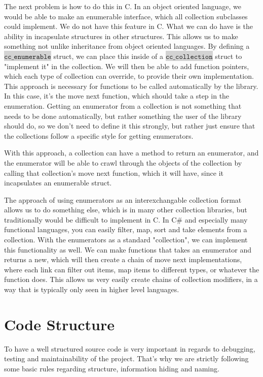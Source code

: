 \documentclass[table]{ituthesis}
\newcommand{\highlight}[1]{\colorbox{lightGray}{$\displaystyle \texttt{#1}$}}
\begin{document}
The next problem is how to do this in C. In an object oriented language, we would be able to make an enumerable interface, which all collection subclasses could implement. We do not have this feature in C. What we can do have is the ability in incapsulate structures in other structures. This allows us to make something not unlike inheritance from object oriented languages. By defining a \highlight{cc\_enumerable} struct, we can place this inside of a \highlight{cc\_collection} struct to "implement it" in the collection. We will then be able to add function pointers, which each type of collection can override, to provide their own implementation. This approach is necessary for functions to be called automatically by the library. In this case, it's the move next function, which should take a step in the enumeration. Getting an enumerator from a collection is not something that needs to be done automatically, but rather something the user of the library should do, so we don't need to define it this strongly, but rather just ensure that the collections follow a specific style for getting enumerators.

With this approach, a collection can have a method to return an enumerator, and the enumerator will be able to crawl through the objects of the collection by calling that collection's move next function, which it will have, since it incapsulates an enumerable struct.

The approach of using enumerators as an interexchangable collection format allows us to do something else, which is in many other collection libraries, but traditionally would be difficult to implement in C. In C\# and especially many functional languages, you can easily filter, map, sort and take elements from a collection. With the enumerators as a standard "collection", we can implement this functionality as well. We can make functions that takes an enumerator and returns a new, which will then create a chain of move next implementations, where each link can filter out items, map items to different types, or whatever the function does. This allows us very easily create chains of collection modifiers, in a way that is typically only seen in higher level languages.

\section{Code Structure}\label{sec:arch_code_structure}

To have a well structured source code is very important in regards to debugging, testing and maintainability of the project. That's why we are strictly following some basic rules regarding structure, information hiding and naming.
\end{document}
